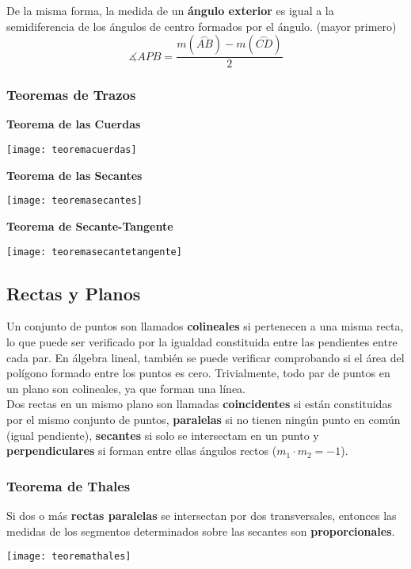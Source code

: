 De la misma forma, la medida de un \textbf{ángulo exterior} es igual a la semidiferencia de los ángulos de centro formados por el ángulo. (mayor primero)
\begin{equation*}
    \measuredangle APB = \frac{m(\stackrel\frown{AB}) - m(\stackrel\frown{CD})}{2}
\end{equation*}

\subsubsection{Teoremas de Trazos}
\textbf{Teorema de las Cuerdas}\\

\begin{center}
\texttt{[image: teoremacuerdas]}
\end{center}
\textbf{Teorema de las Secantes}\\
\begin{center}
\texttt{[image: teoremasecantes]}
\end{center}
\textbf{Teorema de Secante-Tangente}\\
\begin{center}
\texttt{[image: teoremasecantetangente]}
\end{center}

\subsection{Rectas y Planos}
Un conjunto de puntos son llamados \textbf{colineales} si pertenecen a una misma recta, lo que puede ser verificado por la igualdad constituida entre las pendientes entre cada par. En álgebra lineal, también se puede verificar comprobando si el área del polígono formado entre los puntos es cero. Trivialmente, todo par de puntos en un plano son colineales, ya que forman una línea.\\

Dos rectas en un mismo plano son llamadas \textbf{coincidentes} si están constituidas por el mismo conjunto de puntos, \textbf{paralelas} si no tienen ningún punto en común (igual pendiente), \textbf{secantes} si solo se intersectam en un punto y \textbf{perpendiculares} si forman entre ellas ángulos rectos ($m_1 \cdot m_2 = -1$).\\

\subsubsection{Teorema de Thales}
Si dos o más \textbf{rectas paralelas} se intersectan por dos transversales, entonces las medidas de los segmentos determinados sobre las secantes son \textbf{proporcionales}.
\begin{center}
\colorbox{white}{\texttt{[image: teoremathales]}}
\end{center}
